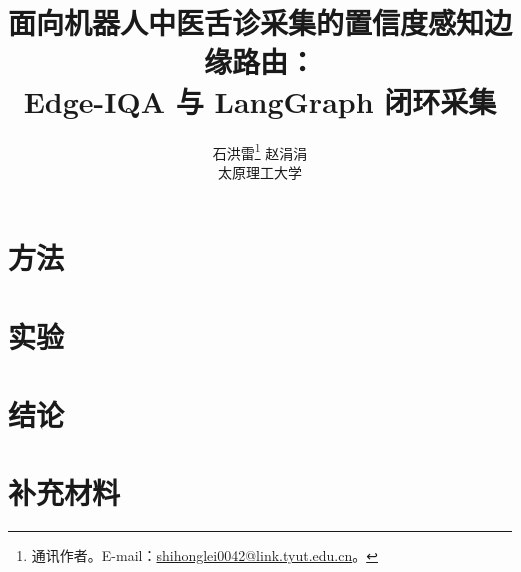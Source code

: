 \documentclass[11pt,twocolumn]{article}
\title{面向机器人中医舌诊采集的置信度感知边缘路由：\\
Edge-IQA 与 LangGraph 闭环采集}
\author{石洪雷\thanks{通讯作者。E-mail：\href{mailto:shihonglei0042@link.tyut.edu.cn}{shihonglei0042@link.tyut.edu.cn}。} \quad 赵涓涓\\
太原理工大学}
\date{}
\numberwithin{equation}{section}
\begin{document}
\maketitle





\section{方法}
\label{sec:method-zh}






\section{实验}
\label{sec:experiments-zh}






\section{结论}







\appendix
\section{补充材料}
\label{sec:supp-zh}




\end{document}
